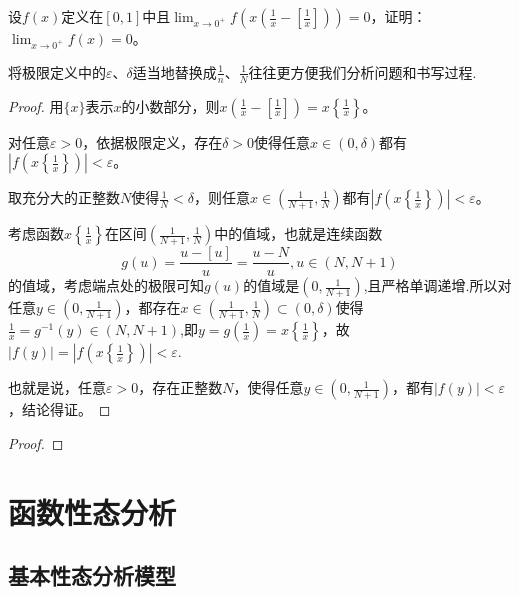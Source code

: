 \documentclass[lang=cn,newtx,10pt,scheme=chinese]{elegantbook}
\begin{document}
\begin{example}
设\(f(x)\)定义在\([0,1]\)中且\(\lim_{x\rightarrow0^{+}}f\left(x\left(\frac{1}{x}-\left[\frac{1}{x}\right]\right)\right)=0\)，证明：\(\lim_{x\rightarrow0^{+}}f(x)=0\)。
\end{example}
\begin{note}
将极限定义中的$\varepsilon、\delta$适当地替换成$\frac{1}{n}、\frac{1}{N}$往往更方便我们分析问题和书写过程.
\end{note}
\begin{proof}
用\(\{x\}\)表示\(x\)的小数部分，则\(x\left(\frac{1}{x}-\left[\frac{1}{x}\right]\right)=x\left\{\frac{1}{x}\right\}\)。

对任意\(\varepsilon>0\)，依据极限定义，存在\(\delta>0\)使得任意\(x\in(0,\delta)\)都有\(\left|f\left(x\left\{\frac{1}{x}\right\}\right)\right|<\varepsilon\)。

取充分大的正整数\(N\)使得\(\frac{1}{N}<\delta\)，则任意\(x\in\left(\frac{1}{N + 1},\frac{1}{N}\right)\)都有\(\left|f\left(x\left\{\frac{1}{x}\right\}\right)\right|<\varepsilon\)。

考虑函数\(x\left\{\frac{1}{x}\right\}\)在区间\(\left(\frac{1}{N + 1},\frac{1}{N}\right)\)中的值域，也就是连续函数
\[g(u)=\frac{u - [u]}{u}=\frac{u - N}{u},u\in(N,N + 1)\]
的值域，考虑端点处的极限可知\(g(u)\)的值域是\(\left(0,\frac{1}{N + 1}\right)\),且严格单调递增.所以对任意\(y\in\left(0,\frac{1}{N + 1}\right)\)，都存在\(x\in\left(\frac{1}{N + 1},\frac{1}{N}\right)\subset(0,\delta)\)使得$\frac{1}{x}=g^{-1}(y)\in(N,N+1)$,即\(y =g(\frac{1}{x})= x\left\{\frac{1}{x}\right\}\)，故\(|f(y)|=\left|f\left(x\left\{\frac{1}{x}\right\}\right)\right|<\varepsilon\).

也就是说，任意\(\varepsilon>0\)，存在正整数\(N\)，使得任意\(y\in\left(0,\frac{1}{N + 1}\right)\)，都有\(|f(y)|<\varepsilon\)，结论得证。
\end{proof}

\begin{example}

\end{example}
\begin{proof}

\end{proof}




\chapter{函数性态分析}

\section{基本性态分析模型}
\end{document}
